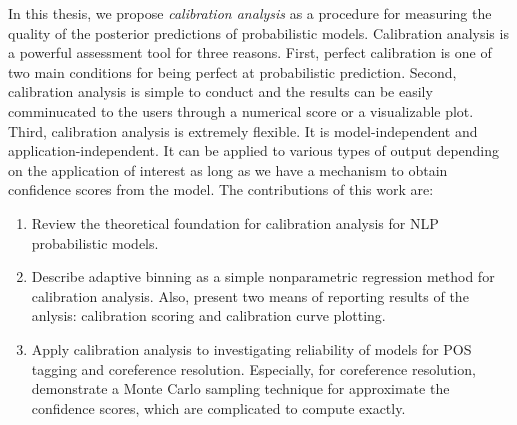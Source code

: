 In this thesis, we propose \textit{calibration analysis} as a procedure for measuring the quality of the posterior predictions of probabilistic models. Calibration analysis is a powerful assessment tool for three reasons. First, perfect calibration is one of two main conditions for being perfect at probabilistic prediction. Second, calibration analysis is simple to conduct and the results can be easily comminucated to the users through a numerical score or a visualizable plot. Third, calibration analysis is extremely flexible. It is model-independent and application-independent. It can be applied to various types of output depending on the application of interest as long as we have a mechanism to obtain confidence scores from the model. The contributions of this work are: 

\begin{enumerate}
  \item Review the theoretical foundation for calibration analysis for NLP probabilistic models.
  \item Describe adaptive binning as a simple nonparametric regression method for calibration analysis. Also, present two means of reporting results of the anlysis: calibration scoring and calibration curve plotting.
  \item Apply calibration analysis to investigating reliability of models for POS tagging and coreference resolution. Especially, for coreference resolution, demonstrate a Monte Carlo sampling technique for approximate the confidence scores, which are complicated to compute exactly.   
\end{enumerate}

